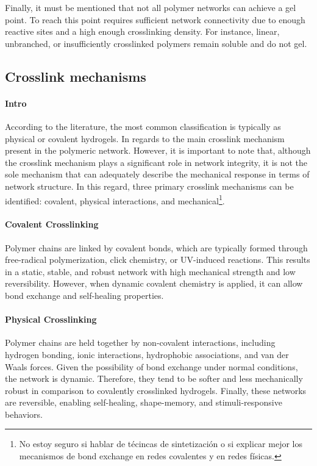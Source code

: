 Finally, it must be mentioned that not all polymer networks can achieve a gel point.
To reach this point requires sufficient network connectivity due to enough reactive sites and a high enough crosslinking density.
For instance, linear, unbranched, or insufficiently crosslinked polymers remain soluble and do not gel.

\subsection{Crosslink mechanisms}

\paragraph{Intro} According to the literature, the most common classification is typically as physical or covalent hydrogels.
In regards to the main crosslink mechanism present in the polymeric network.
However, it is important to note that, although the crosslink mechanism plays a significant role in network integrity, it is not the sole mechanism that can adequately describe the mechanical response in terms of network structure.
In this regard, three primary crosslink mechanisms can be identified: covalent, physical interactions, and mechanical\footnote{No estoy seguro si hablar de técincas de sintetización o si explicar mejor los mecanismos de bond exchange en redes covalentes y en redes físicas.}.

\paragraph{Covalent Crosslinking} Polymer chains are linked by covalent bonds, which are typically formed through free-radical polymerization, click chemistry, or UV-induced reactions.
This results in a static, stable, and robust network with high mechanical strength and low reversibility.
However, when dynamic covalent chemistry is applied, it can allow bond exchange and self-healing properties.

\paragraph{Physical Crosslinking} Polymer chains are held together by non-covalent interactions, including hydrogen bonding, ionic interactions, hydrophobic associations, and van der Waals forces.
Given the possibility of bond exchange under normal conditions, the network is dynamic.
Therefore, they tend to be softer and less mechanically robust in comparison to covalently crosslinked hydrogels.
Finally, these networks are reversible, enabling self-healing, shape-memory, and stimuli-responsive behaviors.

